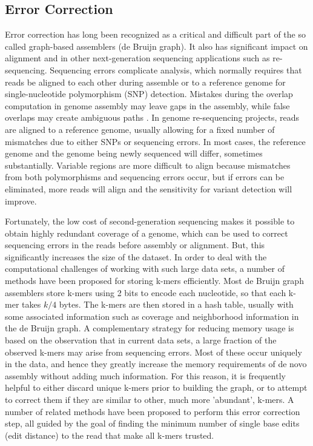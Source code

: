 \documentclass[11pt]{article}
\begin{document}
\subsection{Error Correction \label{ec}}
Error correction has long been recognized as a critical and difficult part of the so called graph-based assemblers (de Bruijn graph). It also has significant impact on alignment and in other next-generation sequencing applications such as re-sequencing. Sequencing errors complicate analysis, which normally requires that reads be aligned to each other during assemble or to a reference genome for single-nucleotide polymorphism (SNP) detection. Mistakes during the overlap computation in genome assembly may leave gaps in the assembly, while false overlaps may create ambiguous paths \cite{quake}. In genome re-sequencing projects, reads are aligned to a reference genome, usually allowing for a fixed number of mismatches due to either SNPs or sequencing errors. In most cases, the reference genome and the genome being newly sequenced will differ, sometimes substantially. Variable regions are more difficult to align because mismatches from both polymorphisms and sequencing errors occur, but if errors can be eliminated, more reads will align and the sensitivity for variant detection will improve.

Fortunately, the low cost of second-generation sequencing makes it possible to obtain highly redundant coverage of a genome, which can be used to correct sequencing errors in the reads before assembly or alignment. But, this significantly increases the size of the dataset. In order to deal with the computational challenges of working with such large data sets, a number of methods have been proposed for storing k-mers efficiently. Most de Bruijn graph assemblers store k-mers using 2 bits to encode each nucleotide, so that each k-mer takes $k/4$ bytes. The k-mers are then stored in a hash table, usually with some associated information such as coverage and neighborhood information in the de Bruijn graph. A complementary strategy for reducing memory usage is based on the observation that in current data sets, a large fraction of the observed k-mers may arise from sequencing errors. Most of these occur uniquely in the data, and hence they greatly increase the memory requirements of de novo assembly without adding much information. For this reason, it is frequently helpful to either discard unique k-mers prior to building the graph, or to attempt to correct them if they are similar to other, much more 'abundant', k-mers. A number of related methods have been proposed to perform this error correction step, all guided by the goal of finding the minimum number of single base edits (edit distance) to the read that make all k-mers trusted.
\end{document}
